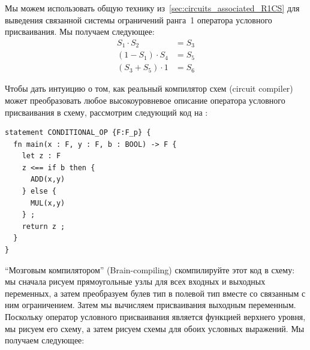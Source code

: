 Мы можем использовать общую технику из~\ref{sec:circuits_associated_R1CS} для выведения связанной системы ограничений ранга~1 оператора условного присваивания. Мы получаем следующее:
\begin{align*}
S_1 \cdot S_2 & = S_3 \\
(1 - S_1) \cdot S_4 & = S_5 \\
(S_3 + S_5)\cdot 1 &= S_6
\end{align*}
\begin{example} Чтобы дать интуицию о том, как реальный компилятор схем (circuit compiler) может преобразовать любое высокоуровневое описание оператора условного присваивания в схему, рассмотрим следующий код на :
\begin{lstlisting}
statement CONDITIONAL_OP {F:F_p} {
  fn main(x : F, y : F, b : BOOL) -> F {
    let z : F 
    z <== if b then { 
      ADD(x,y) 
    } else { 
      MUL(x,y) 
    } ;
    return z ; 
  }
}
\end{lstlisting}
``Мозговым компилятором'' (Brain-compiling) скомпилируйте этот код в схему: мы сначала рисуем прямоугольные узлы для всех входных и выходных переменных, а затем преобразуем булев тип в полевой тип вместе со связанным с ним ограничением. Затем мы вычисляем присваивания выходным переменным. Поскольку оператор условного присваивания является функцией верхнего уровня, мы рисуем его схему, а затем рисуем схемы для обоих условных выражений. Мы получаем следующее:
\begin{center}
\end{center}
\end{example}
